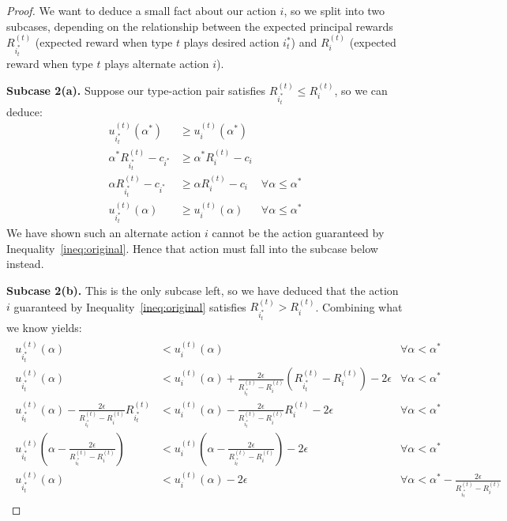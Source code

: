 \documentclass{article}
\newcommand{\TransferCoefficient}{\alpha}
\begin{document}
\begin{proof}
  We want to deduce a small fact about our action $i$, so we split into two subcases, depending on the relationship between the expected principal rewards $R^{(t)}_{i^*_t}$ (expected reward when type $t$ plays desired action $i^*_t$) and $R^{(t)}_{i}$ (expected reward when type $t$ plays alternate action $i$).
  
  \textbf{Subcase 2(a).} Suppose our type-action pair satisfies $R^{(t)}_{i^*_t} \le R^{(t)}_i$, so we can deduce:
  \begin{align*}
    u^{(t)}_{i^*_t}(\TransferCoefficient^*)          &\ge u^{(t)}_i(\TransferCoefficient^*) & \\
    \TransferCoefficient^* R^{(t)}_{i^*_t} - c_{i^*} &\ge \TransferCoefficient^* R^{(t)}_i - c_i & \\
    \TransferCoefficient   R^{(t)}_{i^*_t} - c_{i^*} &\ge \TransferCoefficient   R^{(t)}_i - c_i & \forall \TransferCoefficient \le \TransferCoefficient^* \\
    u^{(t)}_{i^*_t}(\TransferCoefficient)            &\ge u^{(t)}_i(\TransferCoefficient) & \forall \TransferCoefficient \le \TransferCoefficient^*
  \end{align*}
  We have shown such an alternate action $i$ cannot be the action guaranteed by Inequality~\ref{ineq:original}. Hence that action must fall into the subcase below instead.
  
  \textbf{Subcase 2(b).} This is the only subcase left, so we have deduced that the action $i$ guaranteed by Inequality~\ref{ineq:original} satisfies $R^{(t)}_{i^*_t} > R^{(t)}_i$. Combining what we know yields:
  \begin{align*}
  \begin{array}{rll}
    u^{(t)}_{i^*_t}(\TransferCoefficient)
      &< u^{(t)}_i(\TransferCoefficient) & \forall \TransferCoefficient < \TransferCoefficient^* \\
    u^{(t)}_{i^*_t}(\TransferCoefficient)
      &< u^{(t)}_i(\TransferCoefficient) + \frac{2\epsilon}{R^{(t)}_{i^*_t} - R^{(t)}_i} \left(R^{(t)}_{i^*_t} - R^{(t)}_i\right) - 2\epsilon & \forall \TransferCoefficient < \TransferCoefficient^* \\
    u^{(t)}_{i^*_t}(\TransferCoefficient) - \frac{2\epsilon}{R^{(t)}_{i^*_t} - R^{(t)}_i} R^{(t)}_{i^*_t}
      &< u^{(t)}_i(\TransferCoefficient) - \frac{2\epsilon}{R^{(t)}_{i^*_t} - R^{(t)}_i} R^{(t)}_i - 2\epsilon & \forall \TransferCoefficient < \TransferCoefficient^* \\
    u^{(t)}_{i^*_t}\left( \TransferCoefficient - \frac{2\epsilon}{R^{(t)}_{i^*_t} - R^{(t)}_i} \right)
      &< u^{(t)}_i\left( \TransferCoefficient  - \frac{2\epsilon}{R^{(t)}_{i^*_t} - R^{(t)}_i} \right) - 2\epsilon & \forall \TransferCoefficient < \TransferCoefficient^* \\
    u^{(t)}_{i^*_t}(\TransferCoefficient)& < u^{(t)}_i(\TransferCoefficient) - 2 \epsilon & \forall \TransferCoefficient < \TransferCoefficient^* - \frac{2 \epsilon}{R^{(t)}_{i^*_t} - R^{(t)}_i}
  \end{array}
  \end{align*}
  

\end{proof}
\end{document}
